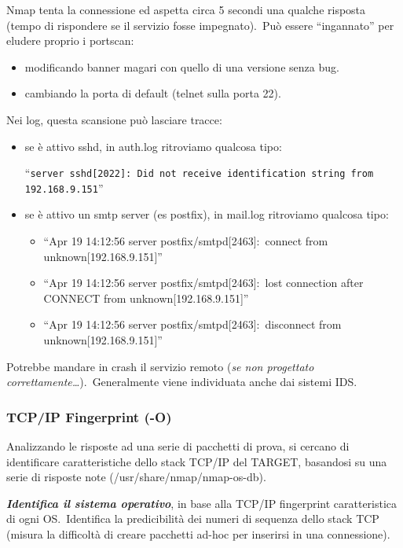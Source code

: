 Nmap tenta la connessione ed aspetta circa 5 secondi una qualche risposta (tempo di rispondere se il servizio fosse impegnato).\
Può essere ``ingannato'' per eludere proprio i portscan:
\begin{itemize}
    \item modificando banner magari con quello di una versione senza bug.
    \item cambiando la porta di default (telnet sulla porta 22).
\end{itemize}
Nei log, questa scansione può lasciare tracce:
\begin{itemize}
    \item se è attivo sshd, in auth.log ritroviamo qualcosa tipo:\
          \begin{flushleft}
              ``\texttt{server sshd[2022]:\ Did not receive identification string from 192.168.9.151}''
          \end{flushleft}
    \item se è attivo un smtp server (es postfix), in mail.log ritroviamo qualcosa tipo:
          \begin{itemize}
              \item ``Apr 19 14:12:56 server postfix/smtpd[2463]:\ connect from unknown[192.168.9.151]''
              \item ``Apr 19 14:12:56 server postfix/smtpd[2463]:\ lost connection after CONNECT from unknown[192.168.9.151]''
              \item ``Apr 19 14:12:56 server postfix/smtpd[2463]:\ disconnect from unknown[192.168.9.151]''
          \end{itemize}
\end{itemize}
Potrebbe mandare in crash il servizio remoto (\emph{se non progettato correttamente\dots}).\
Generalmente viene individuata anche dai sistemi IDS.


\subsubsection{TCP/IP Fingerprint (-O)}

Analizzando le risposte ad una serie di pacchetti di prova, si cercano di identificare caratteristiche dello stack TCP/IP del TARGET, basandosi su una serie di risposte note (/usr/share/nmap/nmap-os-db).\


\textbf{\emph{Identifica il sistema operativo}}, in base alla TCP/IP fingerprint caratteristica di ogni OS.\
Identifica la predicibilità dei numeri di sequenza dello stack TCP (misura la difficoltà di creare pacchetti ad-hoc per inserirsi in una connessione).

